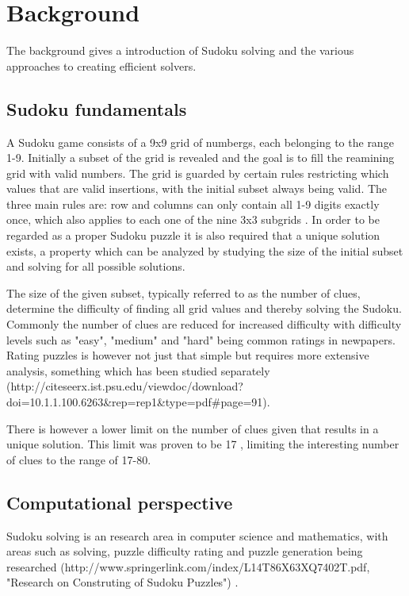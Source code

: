 \documentclass[a4paper,11pt]{kth-mag}
\begin{document}
\chapter{Background}
The background gives a introduction of Sudoku solving and the various approaches to creating efficient solvers.

\section{Sudoku fundamentals}
A Sudoku game consists of a 9x9 grid of numbergs, each belonging to the range 1-9.
Initially a subset of the grid is revealed and the goal is to fill the reamining grid with valid numbers.
The grid is guarded by certain rules restricting which values that are valid insertions, with the initial subset always being valid.
The three main rules are: row and columns can only contain all 1-9 digits exactly once, which also applies to each one of the nine 3x3 subgrids \cite{17clueProof}.
In order to be regarded as a proper Sudoku puzzle it is also required that a unique solution exists, a property which can be analyzed by studying the size of the initial subset and solving for all possible solutions.

The size of the given subset, typically referred to as the number of clues, determine the difficulty of finding all grid values and thereby solving the Sudoku.
Commonly the number of clues are reduced for increased difficulty with difficulty levels such as "easy", "medium" and "hard" being common ratings in newpapers.
Rating puzzles is however not just that simple but requires more extensive analysis, something which has been studied separately (http://citeseerx.ist.psu.edu/viewdoc/download?doi=10.1.1.100.6263\&rep=rep1\&type=pdf\#page=91).

There is however a lower limit on the number of clues given that results in a unique solution.
This limit was proven to be 17 \cite{17clueProof}, limiting the interesting number of clues to the range of 17-80.

\section{Computational perspective}
Sudoku solving is an research area in computer science and mathematics, with areas such as solving, puzzle difficulty rating and puzzle generation being researched \cite{stochastic}(http://www.springerlink.com/index/L14T86X63XQ7402T.pdf, "Research on Construting of Sudoku Puzzles") \cite{generation}.
\end{document}
